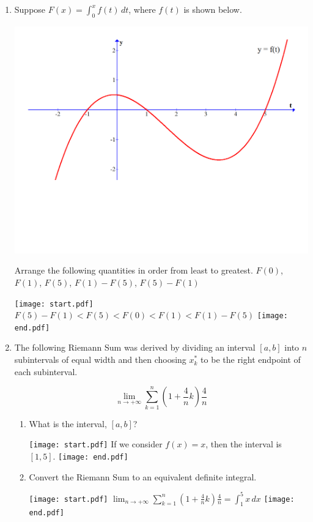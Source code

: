 \documentclass[12pt]{article}
\begin{document}
\begin{enumerate}
\item Suppose $F(x)=\int_0^x{f(t)} \,dt$, where $f(t)$ is shown below.

\hspace{2cm} \includegraphics[scale=0.4]{graph2.pdf}

Arrange the following quantities in order from least to greatest. $F(0)$, $F(1)$, $F(5)$, $F(1)-F(5)$, $F(5)-F(1)$

\texttt{[image: start.pdf]}
{{$F(5)-F(1)<F(5)<F(0)<F(1)<F(1)-F(5)$}}
\texttt{[image: end.pdf]}


\item The following Riemann Sum was derived by dividing an interval $[a,b]$ into $n$ subintervals of equal width and then choosing $x_k^*$ to be the right endpoint of each subinterval.

$$\lim_{n \rightarrow +\infty} \sum_{k=1}^n{\left(1+\frac{4}{n}k\right)\frac{4}{n}}$$

\begin{enumerate}

\item What is the interval, $[a,b]$?

\texttt{[image: start.pdf]}
{{If we consider $f(x)=x$, then the interval is $[1,5]$.}}
\texttt{[image: end.pdf]}


\item Convert the Riemann Sum to an equivalent definite integral.

\texttt{[image: start.pdf]}
{{$\lim_{n \rightarrow +\infty} \sum_{k=1}^n{\left(1+\frac{4}{n}k\right)\frac{4}{n}}=\int_1^5{x} \,dx$}}
\texttt{[image: end.pdf]}



\end{enumerate}
\end{enumerate}
\end{document}
